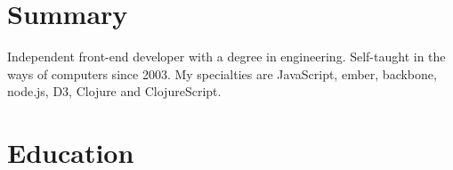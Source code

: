 \documentclass[letterpaper]{deedy-resume} %
\begin{document}
%
%
%
%
%
%
%
%
%
%


\section{Summary}
\flushleft\location{} %

Independent front-end developer with a degree in engineering. Self-taught
in the ways of computers since 2003. My specialties are JavaScript,
ember, backbone, node.js, D3, Clojure and ClojureScript.

\sectionspace %


\section{Education}
\end{document}
